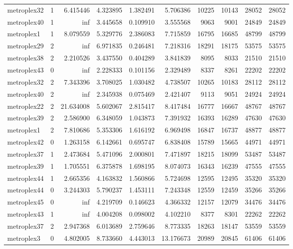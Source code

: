 \begin{longtable}{|l|r|r|r|r|r|r|r|r|r|}
metroplex32 & 1 & 6.415446 & 4.323895 & 1.382491 & 5.706386 & 10225 & 10143 & 28052 & 28052 \\
metroplex40 & 1 & inf & 3.445658 & 0.109910 & 3.555568 & 9063 & 9001 & 24849 & 24849 \\
metroplex1 & 1 & 8.079559 & 5.329776 & 2.386083 & 7.715859 & 16795 & 16685 & 48799 & 48799 \\
metroplex29 & 2 & inf & 6.971835 & 0.246481 & 7.218316 & 18291 & 18175 & 53575 & 53575 \\
metroplex38 & 2 & 2.210526 & 3.437550 & 0.404289 & 3.841839 & 8095 & 8033 & 21510 & 21510 \\
metroplex43 & 0 & inf & 2.228333 & 0.101156 & 2.329489 & 8337 & 8261 & 22202 & 22202 \\
metroplex32 & 2 & 7.343396 & 3.708025 & 1.030482 & 4.738507 & 10265 & 10183 & 28112 & 28112 \\
metroplex40 & 2 & inf & 2.345938 & 0.075469 & 2.421407 & 9113 & 9051 & 24924 & 24924 \\
metroplex22 & 2 & 21.634008 & 5.602067 & 2.815417 & 8.417484 & 16777 & 16667 & 48767 & 48767 \\
metroplex39 & 2 & 2.586900 & 6.348059 & 1.043873 & 7.391932 & 16393 & 16289 & 47630 & 47630 \\
metroplex1 & 2 & 7.810686 & 5.353306 & 1.616192 & 6.969498 & 16847 & 16737 & 48877 & 48877 \\
metroplex42 & 0 & 1.263158 & 6.142661 & 0.695747 & 6.838408 & 15789 & 15665 & 44971 & 44971 \\
metroplex37 & 1 & 2.473684 & 5.471096 & 2.000801 & 7.471897 & 18215 & 18099 & 53487 & 53487 \\
metroplex39 & 1 & 1.705551 & 6.375878 & 1.698195 & 8.074073 & 16343 & 16239 & 47555 & 47555 \\
metroplex44 & 1 & 2.665356 & 4.163832 & 1.560866 & 5.724698 & 12595 & 12495 & 35320 & 35320 \\
metroplex44 & 0 & 3.244303 & 5.790237 & 1.453111 & 7.243348 & 12559 & 12459 & 35266 & 35266 \\
metroplex45 & 0 & inf & 4.219709 & 0.146623 & 4.366332 & 12157 & 12079 & 34476 & 34476 \\
metroplex43 & 1 & inf & 4.004208 & 0.098002 & 4.102210 & 8377 & 8301 & 22262 & 22262 \\
metroplex37 & 2 & 2.947368 & 6.013689 & 2.759646 & 8.773335 & 18263 & 18147 & 53559 & 53559 \\
metroplex3 & 0 & 4.802005 & 8.733660 & 4.443013 & 13.176673 & 20989 & 20845 & 61406 & 61406 \\

\end{longtable}
